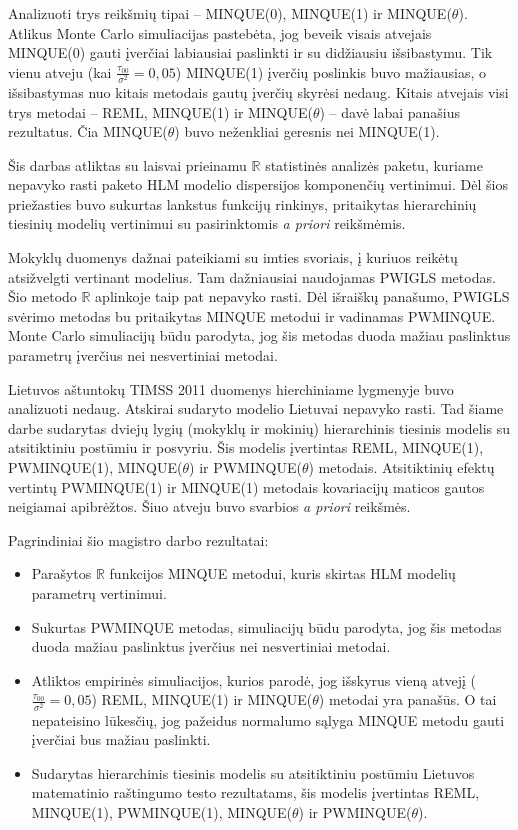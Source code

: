 \documentclass[11pt,a4paper]{article}
\newcommand{\R}{{\mathbb R}}
\begin{document}
\indent Analizuoti trys  reikšmių tipai -- MINQUE(0), MINQUE(1) ir MINQUE($\theta$). Atlikus Monte Carlo simuliacijas pastebėta, jog beveik visais atvejais MINQUE(0) gauti įverčiai labiausiai paslinkti ir su didžiausiu išsibastymu. Tik vienu atveju (kai $\frac{\tau_{00}}{\sigma^2}=0,05$) MINQUE(1) įverčių poslinkis buvo mažiausias, o išsibastymas nuo kitais metodais gautų įverčių skyrėsi nedaug. Kitais atvejais visi trys metodai -- REML, MINQUE(1) ir MINQUE($\theta$) -- davė labai panašius rezultatus. Čia MINQUE($\theta$) buvo neženkliai geresnis nei MINQUE(1). 

\indent Šis darbas atliktas su laisvai prieinamu $\R$ statistinės analizės paketu, kuriame nepavyko rasti paketo HLM modelio dispersijos komponenčių vertinimui. Dėl šios priežasties buvo sukurtas lankstus funkcijų rinkinys, pritaikytas hierarchinių tiesinių modelių vertinimui su pasirinktomis \textit{a priori} reikšmėmis.

\indent Mokyklų duomenys dažnai pateikiami su imties svoriais, į kuriuos reikėtų atsižvelgti vertinant modelius. Tam dažniausiai naudojamas PWIGLS metodas. Šio metodo $\R$ aplinkoje taip pat nepavyko rasti. Dėl išraiškų panašumo, PWIGLS svėrimo metodas bu pritaikytas MINQUE metodui ir vadinamas PWMINQUE. Monte Carlo simuliacijų būdu parodyta, jog šis metodas duoda mažiau paslinktus parametrų įverčius nei nesvertiniai metodai.

\indent Lietuvos aštuntokų TIMSS 2011 duomenys hierchiniame lygmenyje buvo analizuoti nedaug. Atskirai sudaryto modelio Lietuvai nepavyko rasti. Tad šiame darbe sudarytas dviejų lygių (mokyklų ir mokinių) hierarchinis tiesinis modelis su atsitiktiniu postūmiu ir posvyriu. Šis modelis įvertintas REML, MINQUE(1), PWMINQUE(1), MINQUE($\theta$) ir PWMINQUE($\theta$) metodais. Atsitiktinių efektų vertintų PWMINQUE(1) ir MINQUE(1) metodais kovariacijų maticos gautos neigiamai apibrėžtos. Šiuo atveju buvo svarbios \textit{a priori} reikšmės.

\indent Pagrindiniai šio magistro darbo rezultatai:
\begin{itemize}
\item Parašytos $\R$ funkcijos MINQUE metodui, kuris skirtas HLM modelių parametrų vertinimui.
\item Sukurtas PWMINQUE metodas, simuliacijų būdu parodyta, jog šis metodas duoda mažiau paslinktus įverčius nei nesvertiniai metodai.
\item Atliktos empirinės simuliacijos, kurios parodė, jog išskyrus vieną atvejį ($\frac{\tau_{00}}{\sigma^2}=0,05$) REML, MINQUE(1) ir MINQUE($\theta$) metodai yra panašūs. O tai nepateisino lūkesčių, jog pažeidus normalumo sąlyga MINQUE metodu gauti įverčiai bus mažiau paslinkti.
\item Sudarytas hierarchinis tiesinis modelis su atsitiktiniu postūmiu Lietuvos matematinio raštingumo testo rezultatams, šis modelis įvertintas REML, MINQUE(1), PWMINQUE(1), MINQUE($\theta$) ir PWMINQUE($\theta$).
\end{itemize}
\end{document}
